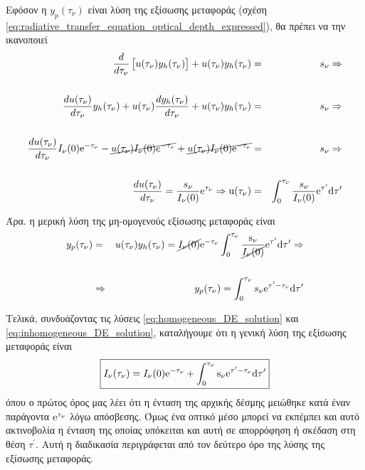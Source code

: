 Εφόσον η $y_p (\tau_{\nu})$ είναι λύση της εξίσωσης μεταφοράς (σχέση \eqref{eq:radiative_transfer_equation_optical_depth_expressed}), θα πρέπει να την ικανοποιεί
\begin{eqnarray*}
    \frac{d}{d\tau_{\nu}} \left[ u(\tau_{\nu}) y_h (\tau_{\nu}) \right] + u(\tau_{\nu}) y_h (\tau_{\nu}) &=& s_{\nu} \Rightarrow \\\\
    \frac{du(\tau_{\nu})}{d \tau_{\nu}} y_h (\tau_{\nu}) + u(\tau_{\nu}) \frac{d y_h (\tau_{\nu})}{d \tau_{\nu}} + u(\tau_{\nu}) y_h(\tau_{\nu}) &=& s_{\nu} \Rightarrow \\\\
    \frac{d u(\tau_{\nu})}{d \tau_{\nu}} I_{\nu}(0) \rm e^{- \tau_{\nu}} - \cancel{u(\tau_{\nu}) I_{\nu}(0) e^{-\tau_{\nu}}} + \cancel{u(\tau_{\nu}) I_{\nu}(0) \rm e^{- \tau_{\nu}}} &=& s_{\nu} \Rightarrow \\\\
    \frac{d u(\tau_{\nu})}{d \tau_{\nu}} = \frac{s_{\nu}}{I_{\nu}(0)} \rm e^{\tau_{\nu}} \Rightarrow u(\tau_{\nu}) &=& \int_{0}^{\tau_{\nu}} \frac{s_{\nu}}{I_{\nu}(0)} \rm e^{\tau^{\prime}} d \tau^{\prime} 
\end{eqnarray*}

Άρα. η μερική λύση της μη-ομογενούς εξίσωσης μεταφοράς είναι
\begin{eqnarray}
    \label{eq:inhomogeneous_DE_solution}
    y_p (\tau_{\nu}) &=& u(\tau_{\nu}) y_h (\tau_{\nu}) = \cancel{I_{\nu}(0)} \rm e^{- \tau_{\nu}} \int_{0}^{\tau_{\nu}} \frac{s_{\nu}}{\cancel{I_{\nu}(0)}} \rm e^{\tau^{\prime}} d \tau^{\prime} \Rightarrow \nonumber \\ \nonumber \\
    &\Rightarrow & y_p (\tau_{\nu}) = \int_{0}^{\tau_{\nu}} s_{\nu} \rm e^{\tau^{\prime} - \tau_{\nu}} d \tau^{\prime}
\end{eqnarray}

Τελικά, συνδυάζοντας τις λύσεις \eqref{eq:homogeneous_DE_solution} και \eqref{eq:inhomogeneous_DE_solution}, καταλήγουμε ότι η γενική λύση της εξίσωσης μεταφοράς είναι
\begin{equation}
    \label{eq:radiative_transfer_general_solution}
    \boxed{I_{\nu} (\tau_{\nu}) = I_{\nu} (0) \rm e^{- \tau_{\nu}} + \int_{0}^{\tau_{\nu}} s_{\nu} \rm e^{\tau^{\prime} - \tau_{\nu}} d \tau^{\prime}}
\end{equation}
όπου ο πρώτος όρος μας λέει ότι η ένταση της αρχικής δέσμης μειώθηκε κατά έναν παράγοντα $\rm e^{\tau_{\nu}}$ λόγω απόσβεσης. Όμως ένα οπτικό μέσο μπορεί να εκπέμπει και αυτό ακτινοβολία η ένταση της οποίας υπόκειται και αυτή σε απορρόφηση ή σκέδαση στη θέση $\tau^{\prime}$. Αυτή η διαδικασία περιγράφεται από τον δεύτερο όρο της λύσης της εξίσωσης μεταφοράς.

